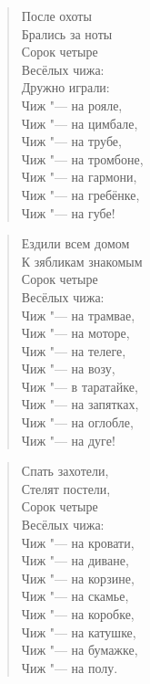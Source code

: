 \begin{verse}               После охоты \\
               Брались за ноты \\
               Сорок четыре \\
               Весёлых чижа: \\
               Дружно играли: \\
               Чиж "--- на рояле, \\
               Чиж "--- на цимбале, \\
               Чиж "--- на трубе, \\
               Чиж "--- на тромбоне,\\ 
               Чиж "--- на гармони, \\
               Чиж "--- на гребёнке, \\
               Чиж "--- на губе! \\\end{verse}

 \begin{verse}              Ездили всем домом \\
               К зябликам знакомым \\
               Сорок четыре \\
               Весёлых чижа: \\
               Чиж "--- на трамвае, \\
               Чиж "--- на моторе, \\
               Чиж "--- на телеге, \\
               Чиж "--- на возу, \\
               Чиж "--- в таратайке, \\
               Чиж "--- на запятках, \\
               Чиж "--- на оглобле, \\
               Чиж "--- на дуге! \\\end{verse}

\begin{verse}               Спать захотели, \\
               Стелят постели, \\
               Сорок четыре \\
               Весёлых чижа: \\
               Чиж "--- на кровати, \\
               Чиж "--- на диване, \\
               Чиж "--- на корзине, \\
               Чиж "--- на скамье, \\
               Чиж "--- на коробке, \\
               Чиж "--- на катушке, \\
               Чиж "--- на бумажке, \\
               Чиж "--- на полу. \\\end{verse}

